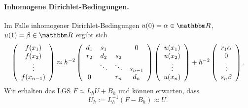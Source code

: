 \documentclass[12pt,a4paper]{book}
\theoremstyle{break}
\theoremstyle{nonumberplain}
\newcommand{\R}{\mathbbm R}
\newcommand{\1}{\mathbbm{1}} 			      	%
\begin{document}
\paragraph{Inhomogene Dirichlet-Bedingungen.} 
Im Falle inhomogener Dirichlet-Bedingungen $u(0)=\alpha\in \R$, $u(1)=\beta\in \R$ ergibt sich
\[
\left( \begin{array}{c} f(x_1)\\ f(x_2)\\ \vdots \\ f(x_{n-1}) \end{array}\right)
\approx h^{-2} \left( \begin{array}{c c c c} d_1 & s_1 &  & 0\\ r_2 & d_2 & s_2 \\ & \ddots & \ddots & s_{n-1}\\ 0  &  & r_{n} & d_{n}\end{array}\right) 
\left( \begin{array}{c} u(x_1)\\ u(x_2)\\ \vdots \\ u(x_{n}) \end{array}\right)
+ h^{-2}
\left( \begin{array}{c} r_1 \alpha\\ 0 \\ \vdots \\ s_{n} \beta \end{array}\right).
\]
Wir erhalten das LGS $F\approx L_h U+B_h$ und können erwarten, dass \[
U_h:=L_h^{-1} (F-B_h)\approx U.
\]
\end{document}
